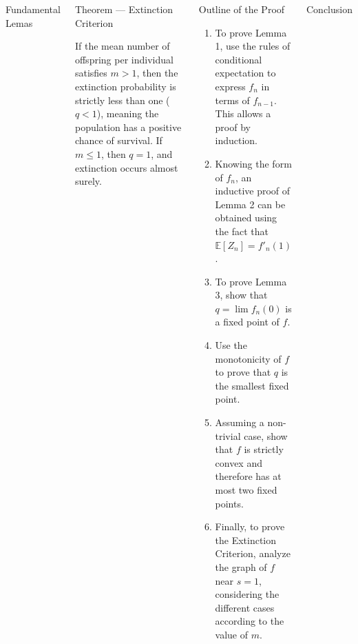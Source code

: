 \documentclass[palette=none,mode=dark]{impaTeXPoster}
\begin{document}
\begin{columns}
\begin{postercard}{Fundamental Lemas}
\begin{itemize}
    \end{itemize}

\end{postercard}


\begin{postercard}{Theorem — Extinction Criterion}

If the mean number of offspring per individual satisfies \(m > 1\), then the extinction probability is strictly less than one (\(q < 1\)), meaning the population has a positive chance of survival.  
If \(m \le 1\), then \(q = 1\), and extinction occurs almost surely.

\end{postercard}

\begin{postercard}{Outline of the Proof}

\begin{enumerate}
    \item To prove Lemma 1, use the rules of conditional expectation to express \(f_n\) in terms of \(f_{n-1}\). This allows a proof by induction.
    \item Knowing the form of \(f_n\), an inductive proof of Lemma 2 can be obtained using the fact that \(\mathbb{E}[Z_n] = f'_n(1)\).
    \item To prove Lemma 3, show that \(q = \lim f_n(0)\) is a fixed point of \(f\).
    \item Use the monotonicity of \(f\) to prove that \(q\) is the smallest fixed point.
    \item Assuming a non-trivial case, show that \(f\) is strictly convex and therefore has at most two fixed points.
    \item Finally, to prove the Extinction Criterion, analyze the graph of \(f\) near \(s = 1\), considering the different cases according to the value of \(m\).
\end{enumerate}

\end{postercard}


\begin{postercard}{Conclusion}


\end{postercard}
\end{columns}
\end{document}
